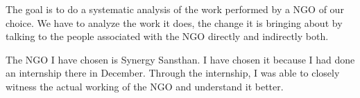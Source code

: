


\begin{abstracts}        %

The goal is to do a systematic analysis of the work performed by a NGO of our choice. We have to analyze the work it does, the change it is bringing about by talking to the people associated with the NGO directly and indirectly both.

The NGO I have chosen is Synergy Sansthan. I have chosen it because I had done an internship there in December. Through the internship, I was able to closely witness the actual working of the NGO and understand it better.

\end{abstracts}




